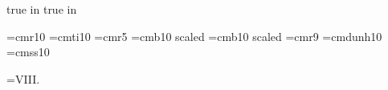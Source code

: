  true in
 true in





\font\dotless=cmr10 %
\font\itdotless=cmti10
\def\itumi{{\"{\itdotless\char'020}}}
\def\itumj{{\"{\itdotless\char'021}}}
\def\umi{{\"{\dotless\char'020}}}
\def\umj{{\"{\dotless\char'021}}}
\font\smaller=cmr5
\font\boldtitlefont=cmb10 scaled
\font\smallboldtitle=cmb10 scaled 
\font\ninerm=cmr9
\font\dun=cmdunh10 %
\font\Rfont=cmss10

\footline={\hfil {\tenrm VIII.\folio}\hfil}

\def\eps{{\varepsilon}}
\def\Eps{{\epsilon}}
\def\kap{{\kappa}}
\def\lam{{\lambda}}
\def\Lam{{\Lambda}}
\def\mynabla{{\nabla\!}}

\def\underNS{\underline{\NS}}
\def\underR{\underline{\R}}

\def\Bmu{{B_{\mu\nu}}}
\def\Gmu{{G_{\mu\nu}}}

\def\xdot{{\dot x}}
\def\xddot{{\ddot x}}

\def\undertext#1{$\underline{\vphantom{y}\hbox{#1}}$}
\def\nspace{\lineskip=1pt\baselineskip=12pt%
     \lineskiplimit=0pt}
\def\dspace{\lineskip=2pt\baselineskip=18pt%
     \lineskiplimit=0pt}

\def\half{\raise4.5pt\hbox{{\vtop{\ialign{##\crcr
  \hfil\rm $1$\hfil\crcr
   \noalign{\nointerlineskip}--\crcr
   \noalign{\nointerlineskip\vskip-1pt}$2$\crcr}}}}}
\def\third{\raise4.5pt\hbox{{\vtop{\ialign{##\crcr
  \hfil\rm $1$\hfil\crcr
  \noalign{\nointerlineskip}--\crcr
  \noalign{\nointerlineskip\vskip-1pt}$3$\crcr}}}}}
\def\fourth{\raise4.5pt\hbox{{\vtop{\ialign{##\crcr
  \hfil\rm $1$\hfil\crcr
  \noalign{\nointerlineskip}--\crcr
  \noalign{\nointerlineskip\vskip-1pt}$4$\crcr}}}}}
\def\sixth{\raise4.5pt\hbox{{\vtop{\ialign{##\crcr
  \hfil\rm $1$\hfil\crcr
  \noalign{\nointerlineskip}--\crcr
  \noalign{\nointerlineskip\vskip-1pt}$6$\crcr}}}}}
\def\eighth{\raise4.5pt\hbox{{\vtop{\ialign{##\crcr
  \hfil\rm $1$\hfil\crcr
  \noalign{\nointerlineskip}--\crcr
  \noalign{\nointerlineskip\vskip-1pt}$8$\crcr}}}}}

